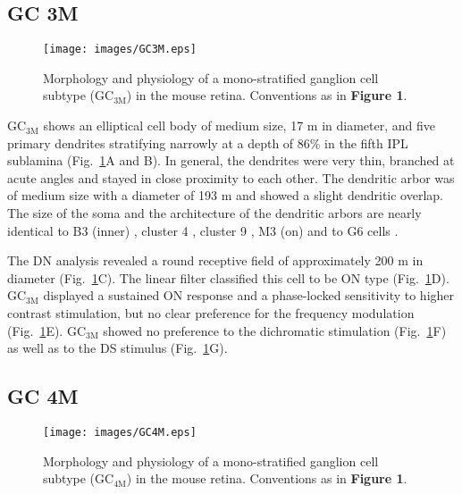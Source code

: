 \subsection{GC 3M}     

\begin{figure}[t]
\begin{center}
\texttt{[image: images/GC3M.eps]}
\caption{Morphology and physiology of a mono-stratified ganglion cell subtype (GC$_\text{{3M}}$) in the mouse retina. Conventions as in \textbf{Figure 1}.}
\label{figure3}
\end{center}
\end{figure}

GC$_{\text{3M}}$ shows an elliptical cell body of medium size, 17 \textmu m in diameter, and five primary dendrites stratifying narrowly at a depth of 86\% in the fifth IPL sublamina (Fig.~\ref{figure3}A and B). In general, the dendrites were very thin, branched at acute angles and stayed in close proximity to each other. The dendritic arbor was of medium size with a diameter of 193 \textmu m and showed a slight dendritic overlap. The size of the soma and the architecture of the dendritic arbors are nearly identical to B3 (inner) \citep{sun02}, cluster 4 \citep{kong05}, cluster 9 \citep{badea04}, M3 (on) \citep{coombs06} and to G6 cells \citep{voelgyi09}. 

The DN analysis revealed a round receptive field of approximately 200 \textmu m in diameter (Fig.~\ref{figure3}C). The linear filter classified this cell to be ON type (Fig.~\ref{figure3}D). GC$_{\text{3M}}$  displayed a sustained ON response and a phase-locked sensitivity to higher contrast stimulation, but no clear preference for the frequency modulation (Fig.~\ref{figure3}E). GC$_{\text{3M}}$ showed no preference to the dichromatic stimulation (Fig.~\ref{figure3}F) as well as to the DS stimulus (Fig.~\ref{figure3}G).


\subsection{GC 4M}     

\begin{figure}[t]
\begin{center}
\texttt{[image: images/GC4M.eps]}
\caption{Morphology and physiology of a mono-stratified ganglion cell subtype (GC$_\text{{4M}}$) in the mouse retina. Conventions as in \textbf{Figure 1}.}
\label{figure4}
\end{center}
\end{figure}

